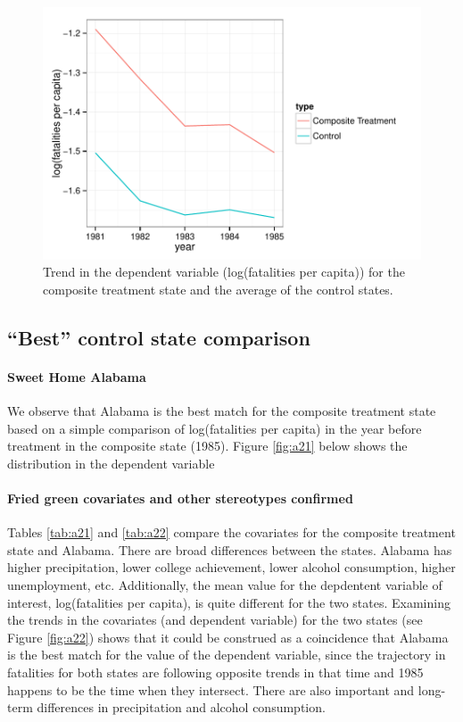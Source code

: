 \documentclass[letterpaper, 12pt]{article}
\begin{document}
\begin{figure}[htbp]
\begin{center}
\includegraphics{img-p2b-logfatTrend.pdf}
\caption{Trend in the dependent variable (log(fatalities per capita)) for the composite treatment state and the average of the control states.}
\label{fig:a11}
\end{center}
\end{figure}


\subsection{``Best'' control state comparison}

\paragraph{Sweet Home Alabama} 
We observe that Alabama is the best match for the composite treatment state based on a simple comparison of log(fatalities per capita) in the year before treatment in the composite state (1985).  Figure \ref{fig:a21} below shows the distribution in the dependent variable 

\paragraph{Fried green covariates and other stereotypes confirmed}
Tables \ref{tab:a21} and \ref{tab:a22} compare the covariates for the composite treatment state and Alabama.  There are broad differences between the states.  Alabama has higher precipitation, lower college achievement, lower alcohol consumption, higher unemployment, etc.  Additionally, the mean value for the depdentent variable of interest, log(fatalities per capita), is quite different for the two states.  Examining the trends in the covariates (and dependent variable) for the two states (see Figure \ref{fig:a22}) shows that it could be construed as a coincidence that Alabama is the best match for the value of the dependent variable, since the trajectory in fatalities for both states are following opposite trends in that time and 1985 happens to be the time when they intersect.  There are also important and long-term differences in precipitation and alcohol consumption.  
\end{document}
